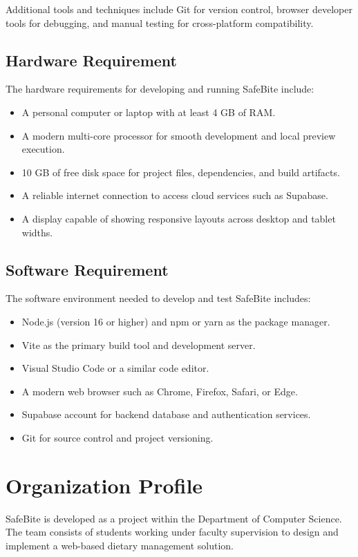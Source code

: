 \documentclass[12pt,a4paper]{report}
\begin{document}
Additional tools and techniques include Git for version control, browser developer tools for debugging, and manual testing for cross-platform compatibility.

\section{Hardware Requirement}
The hardware requirements for developing and running SafeBite include:
\begin{itemize}
  \item A personal computer or laptop with at least 4 GB of RAM.
  \item A modern multi-core processor for smooth development and local preview execution.
  \item 10 GB of free disk space for project files, dependencies, and build artifacts.
  \item A reliable internet connection to access cloud services such as Supabase.
  \item A display capable of showing responsive layouts across desktop and tablet widths.
\end{itemize}

\section{Software Requirement}
The software environment needed to develop and test SafeBite includes:
\begin{itemize}
  \item Node.js (version 16 or higher) and npm or yarn as the package manager.
  \item Vite as the primary build tool and development server.
  \item Visual Studio Code or a similar code editor.
  \item A modern web browser such as Chrome, Firefox, Safari, or Edge.
  \item Supabase account for backend database and authentication services.
  \item Git for source control and project versioning.
\end{itemize}

\chapter{Organization Profile}
SafeBite is developed as a project within the Department of Computer Science. The team consists of students working under faculty supervision to design and implement a web-based dietary management solution.
\end{document}

